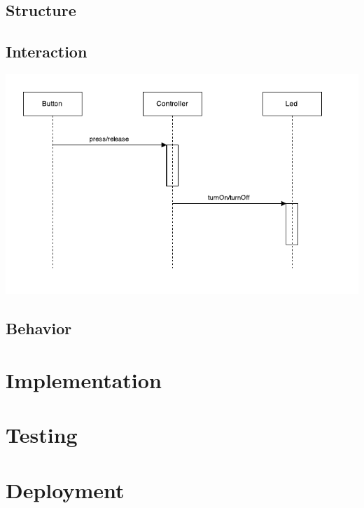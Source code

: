 \documentclass{llncs}
\newcommand{\labelsec}[1]{\label{sec:#1}}
\begin{document}
\subsection{Structure}
\subsection{Interaction}
\begin{center}
\includegraphics{img/graphs/Interaction.pdf}
\end{center}
\subsection{Behavior}
\section{Implementation}
\labelsec{Implementation}

\section{Testing}
\labelsec{testing}

\section{Deployment}
\labelsec{Deployment}
\end{document}
